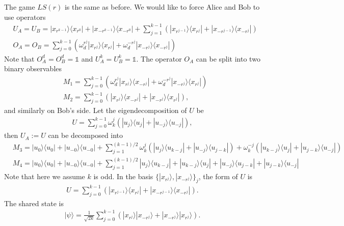 \documentclass[11pt,letterpaper]{article}
\newcommand{\ket}[1]{|#1\rangle}
\newcommand{\ketbra}[2]{|#1\rangle\langle#2|}
\newcommand{\1}{\mathbb{1}}
\newcommand{\LS}{LS}
\theoremstyle{definition}
\begin{document}
The game $\LS(r)$ is the same as before.
We would like to force Alice and Bob to use operators
\begin{align*}
    &U_A = U_B = \ketbra{x_{r^{k-1}}}{x_{r^0}}
    + \ketbra{x_{-r^{k-1}}}{x_{-r^0}}+
    \sum_{j=1}^{k-1} \left(\ketbra{x_{r^{j-1}}}{x_{r^j}} + \ketbra{x_{-r^{j-1}}}{x_{-r^j}}\right)\\
    &O_A = O_B = \sum_{j=0}^{k-1} \left(\omega_d^{r^j}\ketbra{x_{r^j}}{x_{r^j}} + \omega_d^{-r^j} \ketbra{x_{-r^j}}{x_{-r^j}}\right)
\end{align*}
Note that $O_A^d = O_B^d = \1$ and $U_A^k = U_B^k = \1$.
The operator $O_A$ can be split into two binary observables
\begin{align*}
    &M_1 = \sum_{j=0}^{k-1} \left( \omega_d^{r^j}\ketbra{x_{r^j}}{x_{-r^j}} +\omega_d^{-r^j} \ketbra{x_{-r^j}}{x_{r^j}}\right) \\
    &M_2 = \sum_{j=0}^{k-1} \left( \ketbra{x_{r^j}}{x_{-r^j}} + \ketbra{x_{-r^j}}{x_{r^j}}\right),
\end{align*}
and similarly on Bob's side.
Let the eigendecomposition of $U$ be 
\begin{align*}
    U = \sum_{j=0}^{k-1} \omega_k^j \left(\ketbra{u_j}{u_j}
    + \ketbra{u_{-j}}{u_{-j}}\right),
\end{align*}
then $U_A := U$ can be decomposed into
\begin{align*}
    &M_3 = \ketbra{u_0}{u_0} + 
    \ketbra{u_{-0}}{u_{-0}} +
    \sum_{j=1}^{(k-1)/2} \omega_k^j\left(\ketbra{u_j}{u_{k-j}} +  \ketbra{u_{-j}}{u_{j-k}}\right)
    +\omega_k^{-j}\left(\ketbra{u_{k-j}}{u_{j}} + \ketbra{u_{j-k}}{u_{-j}}\right) \\
    &M_4 = \ketbra{u_0}{u_0} + 
    \ketbra{u_{-0}}{u_{-0}} +
    \sum_{j=1}^{(k-1)/2} \ketbra{u_j}{u_{k-j}} +  
    \ketbra{u_{k-j}}{u_{j}} + 
    \ketbra{u_{-j}}{u_{j-k}} +  
    \ketbra{u_{j-k}}{u_{-j}}
\end{align*}
Note that here we assume $k$ is odd.
In the basis $\{ \ket{x_{r^j}}, \ket{x_{-r^j}}\}_j$, the form of $U$ is
\begin{align}
    U = \sum_{j=0}^{k-1}\left(\ketbra{x_{r^{j-1}}}{x_{r^j}}+\ketbra{x_{-r^{j-1}}}{x_{-r^j}}\right).
\end{align}
The shared state is
\begin{align*}
    \ket{\psi} = \frac{1}{\sqrt{2k}} \sum_{j=0}^{k-1}
    \left(\ket{x_{r^j}}\ket{x_{-r^j}} + \ket{x_{-r^j}}\ket{x_{r^j}}\right).
\end{align*}
\end{document}
